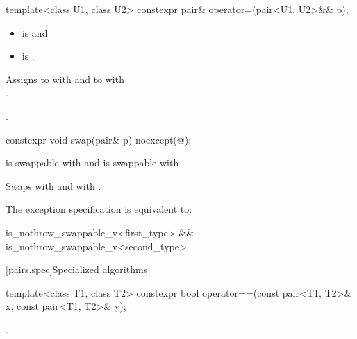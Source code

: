 %
\begin{itemdecl}
template<class U1, class U2> constexpr pair& operator=(pair<U1, U2>&& p);
\end{itemdecl}

\begin{itemdescr}
\pnum
\constraints
\begin{itemize}
\item {} is  and
\item {} is .
\end{itemize}

\pnum
\effects
Assigns to  with 
and to  with\\ .

\pnum
\returns
{}.
\end{itemdescr}

%
\begin{itemdecl}
constexpr void swap(pair& p) noexcept(@\seebelow@);
\end{itemdecl}

\begin{itemdescr}
\pnum
\expects
{} is swappable with  and
 is swappable with .

\pnum
\effects
Swaps
 with  and
 with .

\pnum
\remarks
The exception specification is equivalent to:
\begin{codeblock}
is_nothrow_swappable_v<first_type> && is_nothrow_swappable_v<second_type>
\end{codeblock}
\end{itemdescr}

[pairs.spec]{Specialized algorithms}

%
\begin{itemdecl}
template<class T1, class T2>
  constexpr bool operator==(const pair<T1, T2>& x, const pair<T1, T2>& y);
\end{itemdecl}

\begin{itemdescr}
\pnum
\returns
{}.
\end{itemdescr}

